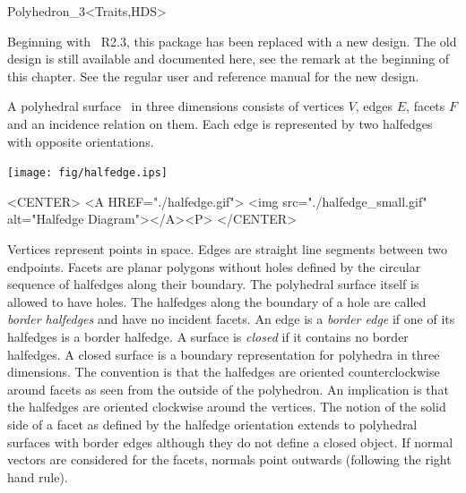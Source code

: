 \begin{ccClassTemplate}{Polyhedron_3<Traits,HDS>}
\label{sectionPolyhedron}


Beginning with \cgal\ R2.3, this package has been replaced with a new
design. The old design is still available and documented here, see the
remark at the beginning of this chapter. See the regular user and
reference manual for the new design.

\ccDefinition  

A polyhedral surface \ccClassTemplateName\ in three dimensions
consists of vertices $V$, edges $E$, facets $F$ and an incidence
relation on them.  Each edge is represented by two halfedges with
opposite orientations.

\begin{ccTexOnly}
    \vspace{-7mm}
    \begin{center}
      \parbox{0.4\textwidth}{%
          \texttt{[image: fig/halfedge.ips]}%
      }
    \end{center}
    \vspace{-5mm}
\end{ccTexOnly}

\begin{ccHtmlOnly}
    <CENTER>
    <A HREF="./halfedge.gif">
        <img src="./halfedge_small.gif" alt="Halfedge Diagram"></A><P>
    </CENTER>
\end{ccHtmlOnly}

Vertices represent points in space. Edges are straight line segments
between two endpoints. Facets are planar polygons without holes
defined by the circular sequence of halfedges along their boundary.
The polyhedral surface itself is allowed to have holes. The halfedges
along the boundary of a hole are called {\em border halfedges\/} and
have no incident facets. An edge is a {\em border edge\/} if one of
its halfedges is a border halfedge.  A surface is {\em closed\/} if it
contains no border halfedges. A closed surface is a boundary
representation for polyhedra in three dimensions. The convention is
that the halfedges are oriented counterclockwise around facets as seen
from the outside of the polyhedron. An implication is that the
halfedges are oriented clockwise around the vertices. The notion of
the solid side of a facet as defined by the halfedge orientation
extends to polyhedral surfaces with border edges although they do not
define a closed object. If normal vectors are considered for the
facets, normals point outwards (following the right hand rule).


\end{ccClassTemplate}
